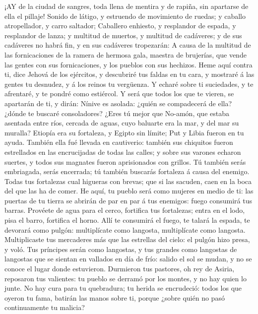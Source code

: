  ¡AY de la ciudad de sangres, toda llena de mentira y de
rapiña, sin apartarse de ella el pillaje!  Sonido de látigo,
y estruendo de movimiento de ruedas; y caballo atropellador, y carro
saltador;  Caballero enhiesto, y resplandor de espada, y
resplandor de lanza; y multitud de muertos, y multitud de cadáveres; y
de sus cadáveres no habrá fin, y en sus cadáveres tropezarán:
 A causa de la multitud de las fornicaciones de la ramera de
hermosa gala, maestra de brujerías, que vende las gentes con sus
fornicaciones, y los pueblos con sus hechizos.  Heme aquí
contra ti, dice Jehová de los ejércitos, y descubriré tus faldas en tu
cara, y mostraré á las gentes tu desnudez, y á los reinos tu vergüenza.
 Y echaré sobre ti suciedades, y te afrentaré, y te pondré
como estiércol.  Y será que todos los que te vieren, se
apartarán de ti, y dirán: Nínive es asolada: ¿quién se compadecerá de
ella? ¿dónde te buscaré consoladores?  ¿Eres tú mejor que
No-amón, que estaba asentada entre ríos, cercada de aguas, cuyo baluarte
era la mar, y del mar su muralla?  Etiopía era su fortaleza,
y Egipto sin límite; Put y Libia fueron en tu ayuda. 
También ella fué llevada en cautiverio: también sus chiquitos fueron
estrellados en las encrucijadas de todas las calles; y sobre sus varones
echaron suertes, y todos sus magnates fueron aprisionados con grillos.
 Tú también serás embriagada, serás encerrada; tú también
buscarás fortaleza á causa del enemigo.  Todas tus
fortalezas cual higueras con brevas; que si las sacuden, caen en la boca
del que las ha de comer.  He aquí, tu pueblo será como
mujeres en medio de ti: las puertas de tu tierra se abrirán de par en
par á tus enemigos: fuego consumirá tus barras.  Provéete
de agua para el cerco, fortifica tus fortalezas; entra en el lodo, pisa
el barro, fortifica el horno.  Allí te consumirá el fuego,
te talará la espada, te devorará como pulgón: multiplícate como
langosta, multiplícate como langosta.  Multiplicaste tus
mercaderes más que las estrellas del cielo: el pulgón hizo presa, y
voló.  Tus príncipes serán como langostas, y tus grandes
como langostas de langostas que se sientan en vallados en día de frío:
salido el sol se mudan, y no se conoce el lugar donde estuvieron.
 Durmieron tus pastores, oh rey de Asiria, reposaron tus
valientes: tu pueblo se derramó por los montes, y no hay quien lo junte.
 No hay cura para tu quebradura; tu herida se encrudeció:
todos los que oyeron tu fama, batirán las manos sobre ti, porque ¿sobre
quién no pasó continuamente tu malicia?
